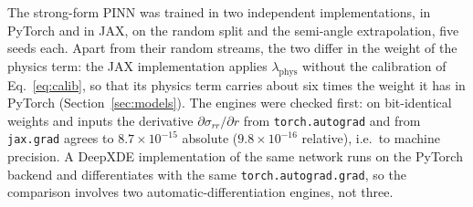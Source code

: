 \documentclass[subscriptcorrection,upint,varvw,barcolor=Goldenrod3,mathalfa=cal=euler,balance,hyphenate,french,pdf-a]{asmejour} %
\begin{document}
The strong-form PINN was trained in two independent implementations, in PyTorch and in JAX, on the random split and the semi-angle extrapolation, five seeds each. Apart from their random streams, the two differ in the weight of the physics term: the JAX implementation applies $\lambda_{\mathrm{phys}}$ without the calibration of Eq.~\eqref{eq:calib}, so that its physics term carries about six times the weight it has in PyTorch (Section~\ref{sec:models}). The engines were checked first: on bit-identical weights and inputs the derivative $\partial\sigma_{rr}/\partial r$ from \texttt{torch.autograd} and from \texttt{jax.grad} agrees to $8.7\times10^{-15}$ absolute ($9.8\times10^{-16}$ relative), i.e.\ to machine precision. A DeepXDE implementation \citep{lu2021} of the same network runs on the PyTorch backend and differentiates with the same \texttt{torch.autograd.grad}, so the comparison involves two automatic-differentiation engines, not three.
\end{document}

